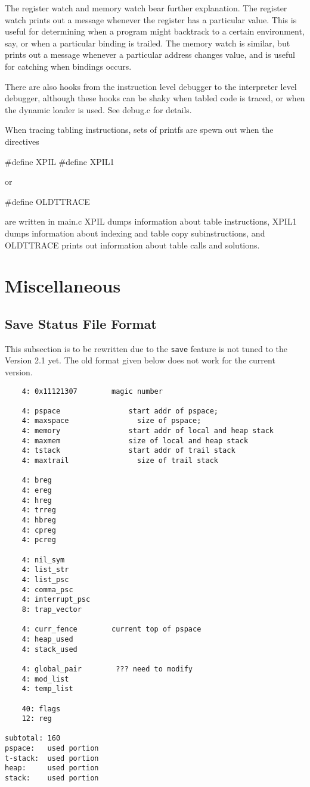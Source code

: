 \documentclass[11pt]{article}
\newcommand{\version}{Version 2.1}
\begin{document}
The register watch and memory watch bear further explanation.  The
register watch prints out a message whenever the register has a
particular value.  This is useful for determining when a program
might backtrack to a certain environment, say, or when a particular
binding is trailed.  The memory watch is similar, but prints out a
message whenever a particular address changes value, and is useful for
catching when bindings occurs.

There are also hooks from the instruction level debugger to the
interpreter level debugger, although these hooks can be shaky when
tabled code is traced, or when the dynamic loader is used.  See
debug.c for details.

When tracing tabling instructions, sets of printfs are spewn out when
the directives
\begin{center}
\#define XPIL
\#define XPIL1
\end{center}
or
\begin{center}
\#define OLDTTRACE
\end{center}
are written in main.c  XPIL dumps information about table
instructions, XPIL1 dumps information about indexing and table copy
subinstructions, and OLDTTRACE prints out information about table
calls and solutions.

\section                 {Miscellaneous}

\subsection{Save Status File Format}

This subsection is to be rewritten due to the {\tt save} feature
is not tuned to the \version \mbox{} yet. The old format given below does
not work for the current version.

\begin{verbatim}
    4: 0x11121307        magic number

    4: pspace                start addr of pspace;
    4: maxspace                size of pspace;
    4: memory                start addr of local and heap stack
    4: maxmem                size of local and heap stack
    4: tstack                start addr of trail stack
    4: maxtrail                size of trail stack

    4: breg
    4: ereg
    4: hreg
    4: trreg
    4: hbreg
    4: cpreg
    4: pcreg

    4: nil_sym
    4: list_str
    4: list_psc
    4: comma_psc
    4: interrupt_psc
    8: trap_vector

    4: curr_fence        current top of pspace
    4: heap_used
    4: stack_used

    4: global_pair        ??? need to modify
    4: mod_list
    4: temp_list

    40: flags
    12: reg

subtotal: 160
pspace:   used portion
t-stack:  used portion
heap:     used portion
stack:    used portion
\end{verbatim}
\end{document}
